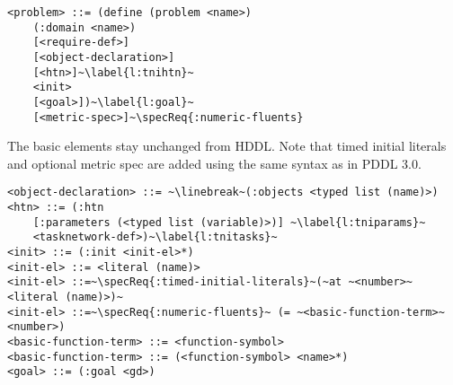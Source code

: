 \documentclass[letterpaper]{article} %
\begin{document}
\begin{lstlisting}[firstnumber=last, escapechar=~]
<problem> ::= (define (problem <name>)
    (:domain <name>)
    [<require-def>]
    [<object-declaration>]
    [<htn>]~\label{l:tnihtn}~
    <init>
    [<goal>])~\label{l:goal}~
    [<metric-spec>]~\specReq{:numeric-fluents}
\end{lstlisting}

The basic elements stay unchanged from HDDL. Note that timed initial literals and optional metric spec are added using the same syntax as in PDDL 3.0.

\begin{lstlisting}[firstnumber=last, escapechar=~]
<object-declaration> ::= ~\linebreak~(:objects <typed list (name)>)
<htn> ::= (:htn
    [:parameters (<typed list (variable)>)] ~\label{l:tniparams}~
    <tasknetwork-def>)~\label{l:tnitasks}~
<init> ::= (:init <init-el>*)
<init-el> ::= <literal (name)>
<init-el> ::=~\specReq{:timed-initial-literals}~(~at ~<number>~ <literal (name)>)~
<init-el> ::=~\specReq{:numeric-fluents}~ (= ~<basic-function-term>~ <number>)
<basic-function-term> ::= <function-symbol>
<basic-function-term> ::= (<function-symbol> <name>*)
<goal> ::= (:goal <gd>)
\end{lstlisting} %

%
%



\end{document}
